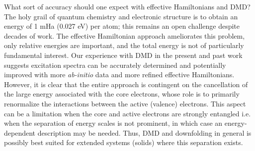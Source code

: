 What sort of accuracy should one expect with effective Hamiltonians and DMD? The holy grail of quantum chemistry 
and electronic structure is to obtain an energy of 1 mHa (0.027 eV) per atom; this 
remains an open challenge despite decades of work. The effective Hamiltonian approach 
ameliorates this problem, only relative energies are important, and 
the total energy is not of particularly fundamental interest. Our experience with DMD in the present and past work~\cite{Changlani2015} 
suggests excitation spectra can be accurately determined and potentially improved with more \textit{ab-initio} data 
and more refined effective Hamiltonians. However, it is clear that the entire approach is contingent on the 
cancellation of the large energy associated with the core electrons, 
whose role is to primarily renormalize the interactions between the active (valence) electrons. 
This aspect can be a limitation when the core and active electrons are strongly entangled i.e. 
when the separation of energy scales is not prominent, in which case an energy-dependent description may be needed. 
Thus, DMD and downfolding in general is possibly best suited for extended systems (solids) where this separation exists. 

